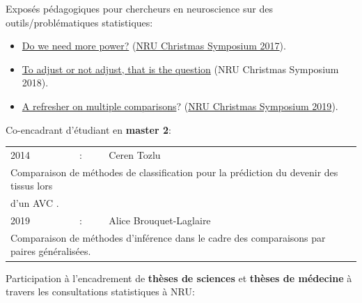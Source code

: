 \documentclass[12pt]{article}
\begin{document}
\bigskip

Exposés pédagogiques pour chercheurs en neuroscience sur des
outils/problématiques statistiques:
\begin{itemize}
\item \href{https://bozenne.github.io/doc/Talks/2017-XNRU-power.pdf}{Do we need more power?} (\href{https://www.nru.dk/images/News/NeurobiologyResearchUnit-Christmas-symposium2017.pdf}{NRU Christmas Symposium 2017}).
\item \href{https://bozenne.github.io/doc/Talks/2018-XNRU-DAGs.pdf}{To adjust or not adjust, that is the question} (NRU Christmas Symposium 2018).
\item \href{https://bozenne.github.io/doc/Talks/2019-XNRU-multcomp.pdf}{A refresher on multiple comparisons}? (\href{https://nru.dk/index.php/news-menu/279-nru-christimas-symposium-2019}{NRU Christmas Symposium 2019}).
\end{itemize}

\bigskip

Co-encadrant d'étudiant en \textbf{master 2}: 

\medskip

\begin{tabular}{l@{ }l@{ }l}
2014 &:& Ceren Tozlu \\
\multicolumn{3}{l}{Comparaison de méthodes de classification pour la prédiction du devenir des tissus lors} \\ 
\multicolumn{3}{l}{d'un AVC \citep{tozlu2019comparison}.} \\ [3mm]
2019 &:& Alice Brouquet-Laglaire \\
\multicolumn{3}{l}{Comparaison de méthodes d’inférence dans le cadre des comparaisons par paires généralisées.} \\ [3mm]
\end{tabular}

\bigskip

Participation à l'encadrement de \textbf{thèses de sciences} et \textbf{thèses de
médecine} à travers les consultations statistiques à NRU:

\medskip
\end{document}
